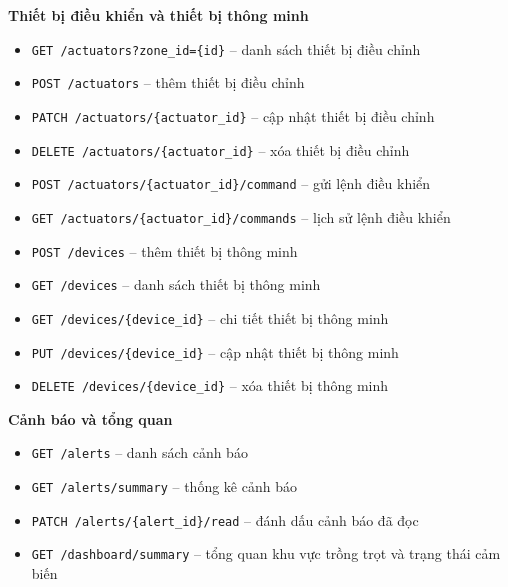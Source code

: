 \documentclass[13pt,a4paper]{extarticle}
\numberwithin{figure}{section}
\numberwithin{table}{section}
\begin{document}
	\noindent
	\textbf{Thiết bị điều khiển và thiết bị thông minh}
	\begin{itemize}
		\item \texttt{GET /actuators?zone\_id=\{id\}} -- danh sách thiết bị điều chỉnh
		\item \texttt{POST /actuators} -- thêm thiết bị điều chỉnh
		\item \texttt{PATCH /actuators/\{actuator\_id\}} -- cập nhật thiết bị điều chỉnh
		\item \texttt{DELETE /actuators/\{actuator\_id\}} -- xóa thiết bị điều chỉnh
		\item \texttt{POST /actuators/\{actuator\_id\}/command} -- gửi lệnh điều khiển
		\item \texttt{GET /actuators/\{actuator\_id\}/commands} -- lịch sử lệnh điều khiển
		\item \texttt{POST /devices} -- thêm thiết bị thông minh
		\item \texttt{GET /devices} -- danh sách thiết bị thông minh
		\item \texttt{GET /devices/\{device\_id\}} -- chi tiết thiết bị thông minh
		\item \texttt{PUT /devices/\{device\_id\}} -- cập nhật thiết bị thông minh
		\item \texttt{DELETE /devices/\{device\_id\}} -- xóa thiết bị thông minh
	\end{itemize}
	
	\noindent
	\textbf{Cảnh báo và tổng quan}
	\begin{itemize}
		\item \texttt{GET /alerts} -- danh sách cảnh báo
		\item \texttt{GET /alerts/summary} -- thống kê cảnh báo
		\item \texttt{PATCH /alerts/\{alert\_id\}/read} -- đánh dấu cảnh báo đã đọc
		\item \texttt{GET /dashboard/summary} -- tổng quan khu vực trồng trọt và trạng thái cảm biến
	\end{itemize}
	
\end{document}
